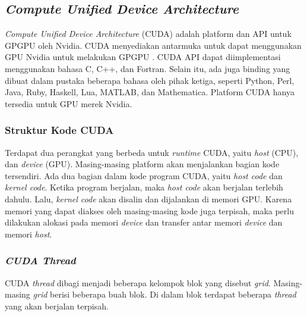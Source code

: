   \subsection{\emph{Compute Unified Device Architecture}}

    \emph{Compute Unified Device Architecture} (CUDA) adalah platform dan API untuk GPGPU oleh Nvidia. CUDA menyediakan antarmuka untuk dapat menggunakan GPU Nvidia untuk melakukan GPGPU \parencite{cuda}. CUDA API dapat diimplementasi menggunakan bahasa C, C++, dan Fortran. Selain itu, ada juga binding yang dibuat dalam pustaka beberapa bahasa oleh pihak ketiga, seperti Python, Perl, Java, Ruby, Haskell, Lua, MATLAB, dan Mathematica. Platform CUDA hanya tersedia untuk GPU merek Nvidia.

    \subsubsection{Struktur Kode CUDA}

      Terdapat dua perangkat yang berbeda untuk \emph{runtime} CUDA, yaitu \emph{host} (CPU), dan \emph{device} (GPU). Masing-masing platform akan menjalankan bagian kode tersendiri. Ada dua bagian dalam kode program CUDA, yaitu \emph{host code} dan \emph{kernel code}. Ketika program berjalan, maka \emph{host code} akan berjalan terlebih dahulu. Lalu, \emph{kernel code} akan disalin dan dijalankan di memori GPU. Karena memori yang dapat diakses oleh masing-masing kode juga terpisah, maka perlu dilakukan alokasi pada memori \emph{device} dan transfer antar memori \emph{device} dan memori \emph{host}.

    \subsubsection{\emph{CUDA Thread}}

      CUDA \emph{thread} dibagi menjadi beberapa kelompok blok yang disebut \emph{grid}. Masing-masing \emph{grid} berisi beberapa buah blok. Di dalam blok terdapat beberapa \emph{thread} yang akan berjalan terpisah. 

